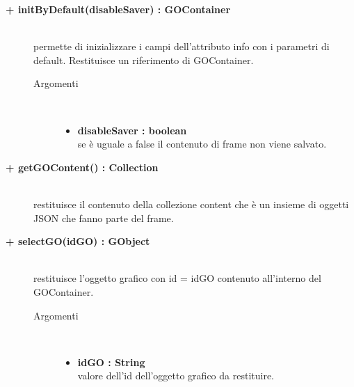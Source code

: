 \begin{description}
\begin{description}
		\item[\textbf{\color{blue}+ initByDefault(disableSaver) : GOContainer			}] \hfill \\
			permette di inizializzare i campi dell'attributo info con i parametri di default. Restituisce un riferimento di GOContainer. 

\begin{description}
			\item[Argomenti] \hfill \\
				\begin{itemize}
						\item \textbf{disableSaver : boolean			} \hfill \\
					se è uguale a false il contenuto di frame non viene salvato. %
				\end{itemize}

\end{description}

\end{description}

\begin{description}
		\item[\textbf{\color{blue}+ getGOContent() : Collection			}] \hfill \\
			restituisce il contenuto della collezione content che è un insieme di oggetti JSON che fanno parte del frame.
\end{description}

\begin{description}
		\item[\textbf{\color{blue}+ selectGO(idGO) : GObject			}] \hfill \\
			restituisce l'oggetto grafico con id = idGO contenuto all'interno del GOContainer. 

\begin{description}
			\item[Argomenti] \hfill \\
				\begin{itemize}
						\item \textbf{idGO : String			} \hfill \\
					valore dell'id dell'oggetto grafico da restituire.  				
				\end{itemize}

\end{description}


\end{description}
\end{description}
